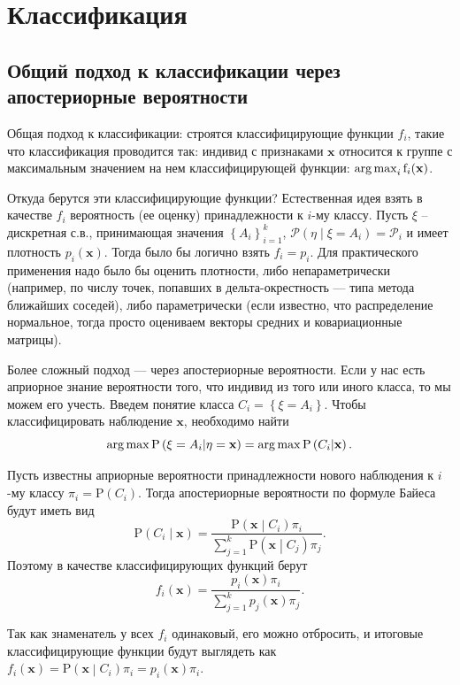 \section{Классификация}
\subsection{Общий подход к классификации через апостериорные вероятности} %
	Общая подход к классификации: строятся классифицирующие функции $f_i$, такие что классификация проводится так:
индивид с признаками $\mathbf{x}$ относится к группе с максимальным значением на нем классифицирующей функции:
$\operatorname*{arg\,max}_i\mathrm f_i(\mathbf{x})$.

 Откуда берутся эти классифицирующие функции? Естественная идея взять в качестве $f_i$ вероятность (ее оценку)
принадлежности к $i$-му классу.
Пусть $\xi$ -- дискретная с.в., принимающая значения $\left\lbrace A_i\right\rbrace_{i=1}^k$, $\mathcal P(\eta\mid \xi = A_i) = \mathcal P_i$ и имеет плотность $p_i(\mathbf{x})$. Тогда было бы логично взять $f_i = p_i$. Для практического применения надо было бы оценить плотности, либо непараметрически (например, по числу точек, попавших в дельта-окрестность --- типа метода ближайших соседей), либо параметрически (если известно, что распределение нормальное, тогда просто оцениваем векторы средних и ковариационные матрицы).

Более сложный подход --- через апостериорные вероятности. Если у нас есть априорное знание вероятности того, что индивид
из того или иного класса, то мы можем его учесть.
Введем понятие класса $C_i = \left\lbrace\xi = A_i\right\rbrace$.  Чтобы классифицировать наблюдение $\mathbf{x}$, необходимо найти
	$$\operatorname*{arg\,max}\mathrm P\left(\xi = A_i\middle\vert \eta = \mathbf{x}\right) = \operatorname*{arg\,max}\mathrm P\left(C_i\middle\vert \mathbf{x}\right).$$

	Пусть известны априорные вероятности принадлежности нового наблюдения к $i$-му классу $\pi_i = \mathrm P\left(C_i\right)$. Тогда апостериорные вероятности по формуле Байеса будут иметь вид $$\mathrm P\left(C_i\middle\vert \mathbf{x}\right) = \frac{\mathrm P\left(\mathbf{x}\middle\vert C_i\right) \pi_i}{\sum_{j=1}^k \mathrm P\left(\mathbf{x}\middle\vert C_j\right) \pi_j}.$$
Поэтому в качестве классифицирующих функций берут
$$f_i\left(\mathbf{x}\right) = \frac{p_i(\mathbf{x}) \pi_i}{\sum_{j=1}^k p_j(\mathbf{x}) \pi_j}. $$

	Так как знаменатель у всех $f_i$ одинаковый, его можно отбросить, и итоговые классифицирующие функции будут выглядеть как $f_i\left(\mathbf{x}\right) = \mathrm P\left(\mathbf{x}\middle\vert C_i\right) \pi_i = p_i(\mathbf{x}) \pi_i$.


